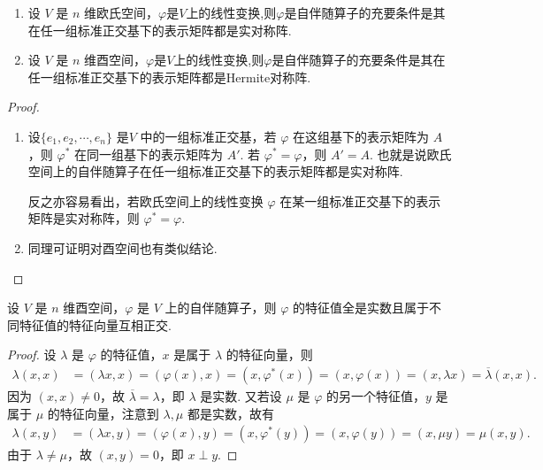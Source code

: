 \documentclass[../../main.tex]{subfiles}%
\begin{document}
\begin{theorem}\label{theorem:内积空间的自伴随算子关于表示矩阵的充要条件}
\begin{enumerate}
\item 设 $V$ 是 $n$ 维欧氏空间，$\varphi$是$V$上的线性变换,则$\varphi$是自伴随算子的充要条件是其在任一组标准正交基下的表示矩阵都是实对称阵.

\item 设 $V$ 是 $n$ 维酉空间，$\varphi$是$V$上的线性变换,则$\varphi$是自伴随算子的充要条件是其在任一组标准正交基下的表示矩阵都是Hermite对称阵. 
\end{enumerate}
\end{theorem}
\begin{proof}
\begin{enumerate}
\item 设$\{e_1,e_2,\cdots,e_n\}$ 是$V$ 中的一组标准正交基，若 $\varphi$ 在这组基下的表示矩阵为 $A$，则 $\varphi^*$ 在同一组基下的表示矩阵为 $A'$. 若 $\varphi^* = \varphi$，则 $A' = A$. 也就是说欧氏空间上的自伴随算子在任一组标准正交基下的表示矩阵都是实对称阵.

反之亦容易看出，若欧氏空间上的线性变换 $\varphi$ 在某一组标准正交基下的表示矩阵是实对称阵，则 $\varphi^* = \varphi$.

\item 同理可证明对酉空间也有类似结论. 
\end{enumerate}
\end{proof}

\begin{theorem}\label{theorem:Hermite算子关于特征值的相关性质}
设 $V$ 是 $n$ 维酉空间，$\varphi$ 是 $V$ 上的自伴随算子，则 $\varphi$ 的特征值全是实数且属于不同特征值的特征向量互相正交.
\end{theorem}
\begin{proof}
设 $\lambda$ 是 $\varphi$ 的特征值，$x$ 是属于 $\lambda$ 的特征向量，则
\begin{align*}
\lambda(x,x) &= (\lambda x,x) = (\varphi(x),x) = (x,\varphi^*(x))= (x,\varphi(x)) = (x,\lambda x) = \overline{\lambda}(x,x).
\end{align*}
因为 $(x,x) \neq 0$，故 $\overline{\lambda} = \lambda$，即 $\lambda$ 是实数. 又若设 $\mu$ 是 $\varphi$ 的另一个特征值，$y$ 是属于 $\mu$ 的特征向量，注意到 $\lambda,\mu$ 都是实数，故有
\begin{align*}
\lambda(x,y) &= (\lambda x,y) = (\varphi(x),y) = (x,\varphi^*(y))= (x,\varphi(y)) = (x,\mu y) = \mu(x,y).
\end{align*}
由于 $\lambda \neq \mu$，故 $(x,y) = 0$，即 $x \perp y$.
\end{proof}
\end{document}
